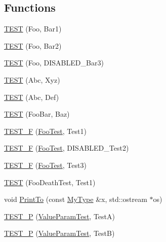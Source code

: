 \subsection*{Functions}
\begin{DoxyCompactItemize}
\item 
\mbox{\hyperlink{googletest-list-tests-unittest___8cc_a1f94d1d04b3e17e0c656f67c43dcd245}{T\+E\+ST}} (Foo, Bar1)
\item 
\mbox{\hyperlink{googletest-list-tests-unittest___8cc_aff0f7cd627da403d28ffe872aec2c8dd}{T\+E\+ST}} (Foo, Bar2)
\item 
\mbox{\hyperlink{googletest-list-tests-unittest___8cc_a0defa1e8ea8c596e9b1ff68e079ac36e}{T\+E\+ST}} (Foo, D\+I\+S\+A\+B\+L\+E\+D\+\_\+\+Bar3)
\item 
\mbox{\hyperlink{googletest-list-tests-unittest___8cc_aea722cccf3017f3cc6aa445ef3062c6b}{T\+E\+ST}} (Abc, Xyz)
\item 
\mbox{\hyperlink{googletest-list-tests-unittest___8cc_a424455aa813a24d05f74ba04cff13167}{T\+E\+ST}} (Abc, Def)
\item 
\mbox{\hyperlink{googletest-list-tests-unittest___8cc_a0c5a078c78b95b153badeea154f57abf}{T\+E\+ST}} (Foo\+Bar, Baz)
\item 
\mbox{\hyperlink{googletest-list-tests-unittest___8cc_abdf83273b95cab0385a014eaa9194380}{T\+E\+S\+T\+\_\+F}} (\mbox{\hyperlink{classFooTest}{Foo\+Test}}, Test1)
\item 
\mbox{\hyperlink{googletest-list-tests-unittest___8cc_a5fa72d1c454dc7b30f5dbe06926f70d1}{T\+E\+S\+T\+\_\+F}} (\mbox{\hyperlink{classFooTest}{Foo\+Test}}, D\+I\+S\+A\+B\+L\+E\+D\+\_\+\+Test2)
\item 
\mbox{\hyperlink{googletest-list-tests-unittest___8cc_a689d13a3da3c5eecd3eba3c512713a12}{T\+E\+S\+T\+\_\+F}} (\mbox{\hyperlink{classFooTest}{Foo\+Test}}, Test3)
\item 
\mbox{\hyperlink{googletest-list-tests-unittest___8cc_acfc50868d2ae644150744ddd74b542f1}{T\+E\+ST}} (Foo\+Death\+Test, Test1)
\item 
void \mbox{\hyperlink{googletest-list-tests-unittest___8cc_aaf76f8f336db1c295fe3aa914c4c6182}{Print\+To}} (const \mbox{\hyperlink{classMyType}{My\+Type}} \&x, std\+::ostream $\ast$os)
\item 
\mbox{\hyperlink{googletest-list-tests-unittest___8cc_adc97fba291db78177b4e5bdf6f6d9018}{T\+E\+S\+T\+\_\+P}} (\mbox{\hyperlink{classValueParamTest}{Value\+Param\+Test}}, TestA)
\item 
\mbox{\hyperlink{googletest-list-tests-unittest___8cc_aa743157309ca6126251b87f7436205a1}{T\+E\+S\+T\+\_\+P}} (\mbox{\hyperlink{classValueParamTest}{Value\+Param\+Test}}, TestB)

\end{DoxyCompactItemize}
